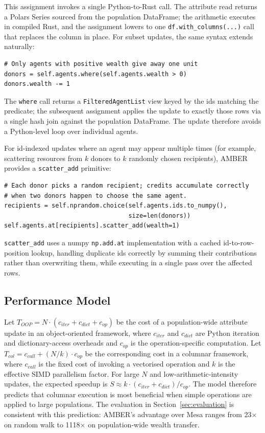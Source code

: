 \documentclass[11pt,a4paper]{article}
\begin{document}
This assignment invokes a single Python-to-Rust call. The attribute read returns a Polars Series sourced from the population DataFrame; the arithmetic executes in compiled Rust, and the assignment lowers to one \texttt{df.with\_columns(...)} call that replaces the column in place. For subset updates, the same syntax extends naturally:

\begin{lstlisting}[caption={Subset-conditional update via a filtered view}]
# Only agents with positive wealth give away one unit
donors = self.agents.where(self.agents.wealth > 0)
donors.wealth -= 1
\end{lstlisting}

The \texttt{where} call returns a \texttt{FilteredAgentList} view keyed by the ids matching the predicate; the subsequent assignment applies the update to exactly those rows via a single hash join against the population DataFrame. The update therefore avoids a Python-level loop over individual agents.

For id-indexed updates where an agent may appear multiple times (for example, scattering resources from $k$ donors to $k$ randomly chosen recipients), AMBER provides a \texttt{scatter\_add} primitive:

\begin{lstlisting}[caption={Id-indexed accumulate with duplicate handling}]
# Each donor picks a random recipient; credits accumulate correctly
# when two donors happen to choose the same agent.
recipients = self.nprandom.choice(self.agents.ids.to_numpy(),
                                  size=len(donors))
self.agents.at[recipients].scatter_add(wealth=1)
\end{lstlisting}

\texttt{scatter\_add} uses a numpy \texttt{np.add.at} implementation with a cached id-to-row-position lookup, handling duplicate ids correctly by summing their contributions rather than overwriting them, while executing in a single pass over the affected rows.

\subsection{Performance Model}

Let $T_{OOP} = N \cdot (c_{iter} + c_{dict} + c_{op})$ be the cost of a population-wide attribute update in an object-oriented framework, where $c_{iter}$ and $c_{dict}$ are Python iteration and dictionary-access overheads and $c_{op}$ is the operation-specific computation. Let $T_{col} = c_{call} + (N/k) \cdot c_{op}$ be the corresponding cost in a columnar framework, where $c_{call}$ is the fixed cost of invoking a vectorised operation and $k$ is the effective SIMD parallelism factor. For large $N$ and low-arithmetic-intensity updates, the expected speedup is $S \approx k \cdot (c_{iter} + c_{dict}) / c_{op}$. The model therefore predicts that columnar execution is most beneficial when simple operations are applied to large populations. The evaluation in Section~\ref{sec:evaluation} is consistent with this prediction: AMBER's advantage over Mesa ranges from 23$\times$ on random walk to 1118$\times$ on population-wide wealth transfer.
\end{document}
